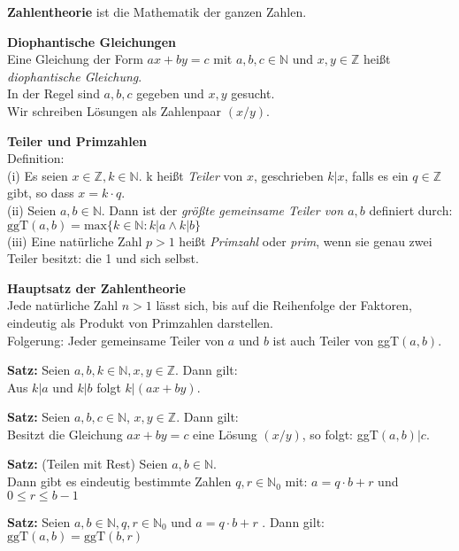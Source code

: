 \documentclass[a4paper]{article}
\begin{document}
\textbf{Zahlentheorie} ist die Mathematik der ganzen Zahlen.
\bigskip

\textbf{Diophantische Gleichungen} \\
Eine Gleichung der Form $a x + b y = c$ mit $a, b,c \in \mathbb{N}$ und $x,y \in \mathbb{Z}$ heißt
\textit{diophantische Gleichung}. \\
In der Regel sind $a,b,c$ gegeben und $x,y$ gesucht. \\
 Wir schreiben 
Lösungen als Zahlenpaar $(x/y)$.
\bigskip

\textbf{Teiler und Primzahlen} \\
Definition: \\
(i) Es seien $x \in \mathbb{Z}, k \in \mathbb{N}$. k heißt \textit{Teiler} von $x$, geschrieben $k|x$, falls
es ein $q \in \mathbb{Z}$ gibt, so dass $x = k \cdot q$. \\
(ii) Seien $a,b \in \mathbb{N}$. Dann ist der \textit{größte gemeinsame Teiler von $a,b$} definiert durch: \\
$\text{ggT}(a,b) = \text{max}\{k \in \mathbb{N} : k | a \land k | b \}$ \\
(iii) Eine natürliche Zahl $p > 1$ heißt \textit{Primzahl} oder \textit{prim}, wenn sie genau zwei
Teiler besitzt: die 1 und sich selbst.
\bigskip

\textbf{Hauptsatz der Zahlentheorie} \\
Jede natürliche Zahl $n > 1$ lässt sich, bis auf die Reihenfolge der Faktoren, eindeutig als Produkt von 
Primzahlen darstellen. \\

Folgerung: Jeder gemeinsame Teiler von $a$ und $b$ ist auch Teiler von ggT$(a,b)$.
\bigskip

\textbf{Satz:} Seien $a,b,k \in \mathbb{N}, x,y \in \mathbb{Z}$. Dann gilt: \\
Aus $k |a$ und $k|b$ folgt $k | (a x + b y)$.
\bigskip

\textbf{Satz:} Seien $a, b,c \in \mathbb{N}$, $x,y \in \mathbb{Z}$. Dann gilt: \\
Besitzt die Gleichung  $a x + b y = c$ eine Lösung $(x/y)$, so folgt: ggT$(a,b) | c$.
\bigskip

\textbf{Satz:} (Teilen mit Rest) Seien $a, b \in \mathbb{N}$. \\
Dann gibt es eindeutig bestimmte Zahlen $q, r \in \mathbb{N}_0$ mit: $a = q \cdot b + r$ und $0 \le r \le b-1$
\bigskip

\textbf{Satz:} Seien $a, b \in \mathbb{N}, q,r \in \mathbb{N}_0$ und $a = q \cdot b + r$ . Dann gilt:\\
$\text{ggT}(a,b) = \text{ggT}(b,r)$
\bigskip
\end{document}
